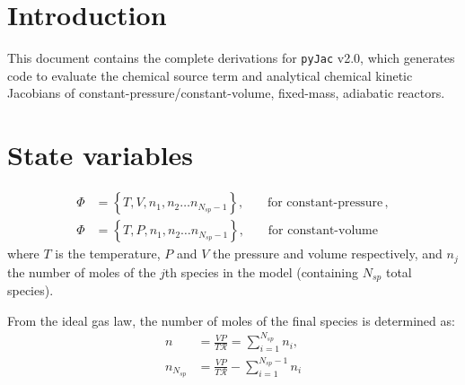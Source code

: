 \documentclass[12pt]{article}
\newcommand{\ns}{\ensuremath{{N_{sp}}}}
\newcommand{\conp}{constant-pressure}
\newcommand{\conv}{constant-volume}
\newcommand{\dconp}{\ensuremath{,\qquad\text{for \conp}}}
\newcommand{\dconv}{\ensuremath{,\qquad\text{for \conv}}}
\newcommand{\Ru}{\ensuremath{\mathcal{R}}}
\begin{document}
\section{Introduction}
This document contains the complete derivations for \texttt{pyJac} v2.0, which generates code to evaluate the chemical source term and analytical chemical kinetic Jacobians of \conp\slash\conv, fixed-mass, adiabatic reactors.

\section{State variables}

\begin{subequations}
\begin{align}
\Phi &= \left\{T, V, n_1, n_2 \ldots n_{\ns - 1}\right\}\dconp, \\
\Phi &= \left\{T, P, n_1, n_2 \ldots n_{\ns - 1}\right\}\dconv
\end{align}
\end{subequations}
where $T$ is the temperature, $P$ and $V$ the pressure and volume respectively, and $n_j$ the number of moles of the $j$th species in the model (containing $\ns$ total species).

From the ideal gas law, the number of moles of the final species is determined as:
\begin{subequations}
\begin{align}
n &= \frac{V P}{T \Ru} = \sum_{i=1}^{\ns}{n_i}, \label{source:moles}\\
n_{\ns} &= \frac{V P}{T \Ru} - \sum_{i=1}^{\ns - 1}{n_i}
\end{align}
\end{subequations}
\end{document}
